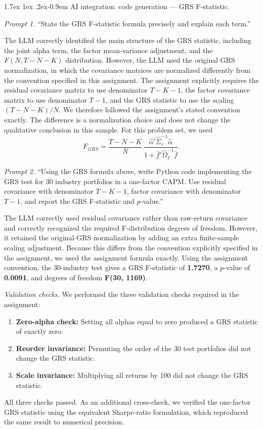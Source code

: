 \documentclass[11pt]{article}
\makeatletter
\renewcommand\paragraph{\@startsection{paragraph}{4}{0pt}%
  {1.7ex \@plus 1ex \@minus .2ex}{-0.9em}%
  {\normalfont\bfseries\normalsize\color{psink}}}
\makeatother
\begin{document}
\paragraph{AI integration: code generation --- GRS F-statistic.}

\textit{Prompt 1.} ``State the GRS F-statistic formula precisely and explain
each term.''

The LLM correctly identified the main structure of the GRS statistic,
including the joint alpha term, the factor mean-variance adjustment, and the
$F(N,T-N-K)$ distribution. However, the LLM used the original GRS
normalization, in which the covariance matrices are normalized differently
from the convention specified in this assignment. The assignment explicitly
requires the residual covariance matrix to use denominator $T-K-1$, the
factor covariance matrix to use denominator $T-1$, and the GRS statistic to
use the scaling $(T-N-K)/N$. We therefore followed the assignment's stated
convention exactly. The difference is a normalization choice and does not
change the qualitative conclusion in this sample. For this problem set, we
used
\[
F_{GRS} = \frac{T-N-K}{N}\,
\frac{\hat{\alpha}'\hat{\Sigma}_{\varepsilon}^{-1}\hat{\alpha}}
{1+\bar f'\hat{\Omega}_f^{-1}\bar f}.
\]

\textit{Prompt 2.} ``Using the GRS formula above, write Python code
implementing the GRS test for 30 industry portfolios in a one-factor CAPM.
Use residual covariance with denominator $T-K-1$, factor covariance with
denominator $T-1$, and report the GRS F-statistic and $p$-value.''

The LLM correctly used residual covariance rather than raw-return covariance
and correctly recognized the required F-distribution degrees of freedom.
However, it retained the original-GRS normalization by adding an extra
finite-sample scaling adjustment. Because this differs from the convention
explicitly specified in the assignment, we used the assignment formula
exactly. Using the assignment convention, the 30-industry test gives a GRS
F-statistic of \textbf{1.7270}, a $p$-value of \textbf{0.0091}, and degrees
of freedom \textbf{F(30, 1169)}.

\textit{Validation checks.} We performed the three validation checks required
in the assignment:
\begin{enumerate}
\setlength{\itemsep}{2pt}\setlength{\parskip}{0pt}
\item \textbf{Zero-alpha check:} Setting all alphas equal to zero produced a
GRS statistic of exactly zero.
\item \textbf{Reorder invariance:} Permuting the order of the 30 test
portfolios did not change the GRS statistic.
\item \textbf{Scale invariance:} Multiplying all returns by 100 did not
change the GRS statistic.
\end{enumerate}
All three checks passed. As an additional cross-check, we verified the
one-factor GRS statistic using the equivalent Sharpe-ratio formulation,
which reproduced the same result to numerical precision.
\end{document}
